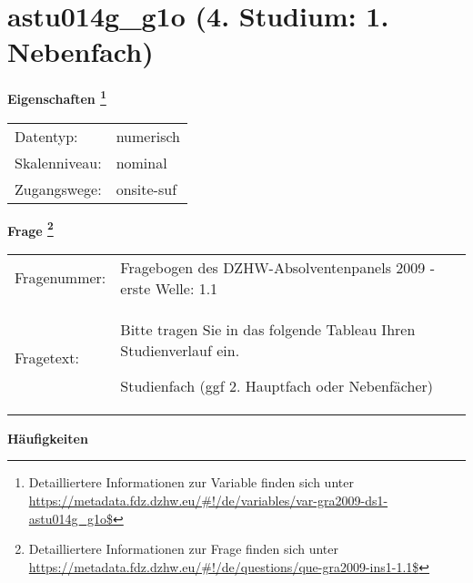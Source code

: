 
    \setcounter{footnote}{0}

    \vspace*{-1.8cm}
	\section{astu014g\_g1o (4. Studium: 1. Nebenfach)}
	\label{section:astu014g_g1o}



    \vspace*{0.5cm}
    \noindent\textbf{Eigenschaften
	\footnote{Detailliertere Informationen zur Variable finden sich unter
		\url{https://metadata.fdz.dzhw.eu/\#!/de/variables/var-gra2009-ds1-astu014g_g1o$}}}\\
	\begin{tabularx}{\hsize}{@{}lX}
	Datentyp: & numerisch \\
	Skalenniveau: & nominal \\
	Zugangswege: &
	  onsite-suf
 \\
    \end{tabularx}



				\vspace*{0.5cm}
                \noindent\textbf{Frage
	                \footnote{Detailliertere Informationen zur Frage finden sich unter
		              \url{https://metadata.fdz.dzhw.eu/\#!/de/questions/que-gra2009-ins1-1.1$}}}\\
				\begin{tabularx}{\hsize}{@{}lX}
					Fragenummer: &
					  Fragebogen des DZHW-Absolventenpanels 2009 - erste Welle:
					  1.1
 \\
					Fragetext: & Bitte tragen Sie in das folgende Tableau Ihren Studienverlauf ein.\par  Studienfach (ggf 2. Hauptfach oder Nebenfächer) \\
				\end{tabularx}





        		\vspace*{0.5cm}
                \noindent\textbf{Häufigkeiten}

